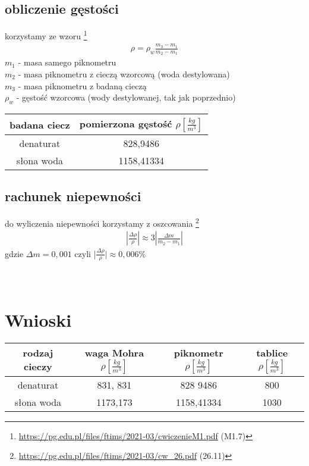 \documentclass{article}
\begin{document}
\subsection{obliczenie gęstości}

korzystamy ze wzoru \footnote{\url{https://pg.edu.pl/files/ftims/2021-03/cwiczenieM1.pdf} (M1.7)} 
\begin{gather*}
	\rho = \rho_w \frac{m_3 - m_1}{m_2 - m_1}
\end{gather*}
$m_1$ - masa samego piknometru \\
$m_2$ - masa piknometru z cieczą wzorcową (woda destylowana) \\
$m_3$ - masa piknometru z badaną cieczą \\
$\rho_w$ - gęstość wzorcowa (wody destylowanej, tak jak poprzednio)

\begin{center}
\begin{tabular}{ c | c }
badana ciecz & pomierzona gęstość $\rho [\frac{kg}{m^3}]$\\
\hline
 denaturat  & 828,9486 \\  
 słona woda & 1158,41334
\end{tabular}
\end{center}
\subsection{rachunek niepewności}
do wyliczenia niepewności korzystamy z oszcowania \footnote{\url{https://pg.edu.pl/files/ftims/2021-03/cw_26.pdf} (26.11)} \\
\begin{gather*}
	|\frac{\Delta\rho}{\rho}| \approx 3|\frac{\Delta m}{m_2 - m_1}|
\end{gather*}
gdzie $\Delta m = 0,001$
czyli |$\frac{\Delta\rho}{\rho}|  \approx 0,006\%$
\\ \\ \\
\section{Wnioski}

\begin{center}
\begin{tabular}{ c | c | c | c }
rodzaj cieczy & waga Mohra  $\rho [\frac{kg}{m^3}]$ & piknometr $\rho [\frac{kg}{m^3}]$ & tablice $\rho [\frac{kg}{m^3}] $ \\

\hline
 denaturat  & 831, 831 &  828 9486 & 800\\  
 słona woda & 1173,173 &1158,41334 & 1030
\end{tabular}
\end{center}
\end{document}
